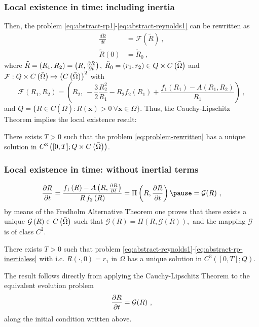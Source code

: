\documentclass[10pt,aspectratio=169]{beamer}
\begin{document}
\begin{frame}\frametitle{Local existence in time: including inertia}
Then, the problem \eqref{eq:abstract-rp1}-\eqref{eq:abstract-reynolds1} can be rewritten as
\begin{equation}
\begin{split}
\frac{d\tilde{R}}{dt}&=\mathcal{F}(\tilde{R})~,\\
\tilde{R}(0)&=\tilde{R}_0~,
\end{split}\label{eq:problem-rewritten}
\end{equation}
where $\tilde{R}=\left(R_1,R_2\right)=\left(R,\frac{\partial R}{\partial t}\right)$, $\tilde{R}_0=(r_1,r_2)\in Q\times C\left(\bar{\Omega}\right)$ and $\mathcal{F}:Q\times C\left(\bar{\Omega}\right)\mapsto \left(C\left(\bar{\Omega}\right)\right)^2$ with
\begin{equation}
\mathcal{F}(R_1,R_2)=\left(
R_2,~-\frac{3}{2}\frac{R_2^2}{R_1}-R_2f_2\left(R_1\right)+\frac{f_1\left(R_1\right)-A\left(R_1,R_2\right)}{R_1}\right)~,
\end{equation}
and $Q=\{R\in C(\bar{\Omega}):R(\mathbf{x})>0~\forall \mathbf{x}\in \bar{\Omega} \}$. Thus, the Cauchy-Lipschitz Theorem implies the local existence result:
\begin{theorem}There exists $T>0$ such that the  problem \eqref{eq:problem-rewritten} has a unique solution in $C^3\left([0,T];Q\times C\left(\bar{\Omega}\right)\right)$.
\end{theorem}
\end{frame}

\begin{frame}
\frametitle{Local existence in time: without inertial terms}
\vspace*{0.6cm}
\begin{equation}
\parder{R}{t}=\frac{f_1\left(R\right)-A\left(R,\parder{R}{t}\right)}{R\,f_2\left(R\right)}=\Pi\left(R,\parder{R}{t}\right)\pause=\mathcal{G}(R)~,\label{eq:abstract-rp-inertialess}
\end{equation}
by means of the Fredholm Alternative Theorem one proves that there exists a unique $\mathcal{G}\left(R\right)\in C\left(\bar{\Omega}\right)$ such that $\mathcal{G}\left(R\right)=\Pi\left(R,\mathcal{G}\left(R\right)\right),$ and the mapping $\mathcal{G}$ is of class $C^2$.
\begin{theorem}There exists $T>0$ such that  problem \eqref{eq:abstract-reynolds1}-\eqref{eq:abstract-rp-inertialess} with i.c. $R\left(\cdot,0\right)=r_1$ in $\Omega$ has a unique solution in $C^3\left([0,T];Q\right)$.
\end{theorem}
The result follows directly from applying the Cauchy-Lipschitz Theorem to the equivalent evolution problem
\begin{equation}
\frac{\partial R}{\partial t}=\mathcal{G}(R)~,\label{eq:ev-problem-G}
\end{equation}
along the initial condition written above.
\end{frame} 
\end{document}
